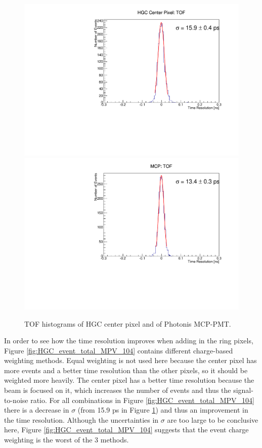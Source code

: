 \documentclass[twocolumn,aps,prd,reprint,superscriptaddress,floatfix]{revtex4-1}
\begin{document}
\begin{figure}%
\centering
	\includegraphics[width=.49\textwidth]{deltaTCenter104.pdf}
	\includegraphics[width=.49\textwidth]{deltaTMCP104.pdf}
	\caption{TOF histograms of HGC center pixel and of Photonis MCP-PMT.}
	\label{fig:center_MCP_104}
\end{figure}

In order to see how the time resolution improves when adding in the ring pixels, Figure \ref{fig:HGC_event_total_MPV_104} contains different charge-based weighting methods. 
Equal weighting is not used here because the center pixel has more events and a better time resolution than the other pixels, so it should be weighted more heavily. 
The center pixel has a better time resolution because the beam is focused on it, which increases the number of events and thus the signal-to-noise ratio. 
For all combinations in Figure \ref{fig:HGC_event_total_MPV_104} there is a decrease in $\sigma$ (from 15.9 ps in Figure \ref{fig:center_MCP_104}) and thus an improvement in the time resolution. 
Although the uncertainties in $\sigma$ are too large to be conclusive here, Figure \ref{fig:HGC_event_total_MPV_104} suggests that the event charge weighting is the worst of the 3 methods.
\end{document}
